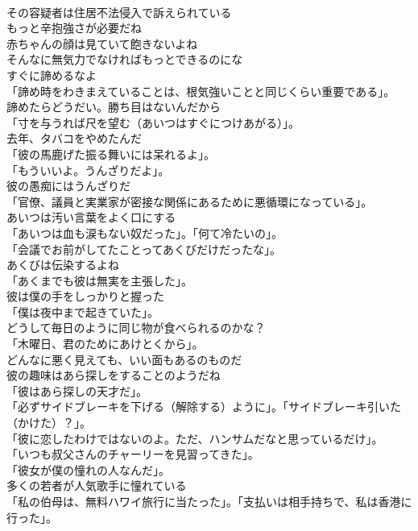 \documentclass[8pt]{extreport}
\begin{document}
\begin{CJK}{UTF8}{min}
\\	その容疑者は住居不法侵入で訴えられている	
\\	もっと辛抱強さが必要だね	
\\	赤ちゃんの顔は見ていて飽きないよね	
\\	そんなに無気力でなければもっとできるのにな	
\\	すぐに諦めるなよ	
\\	「諦め時をわきまえていることは、根気強いことと同じくらい重要である」。	
\\	諦めたらどうだい。勝ち目はないんだから	
\\	「寸を与うれば尺を望む（あいつはすぐにつけあがる）」。	
\\	去年、タバコをやめたんだ	
\\	「彼の馬鹿げた振る舞いには呆れるよ」。	
\\	「もういいよ。うんざりだよ」。	
\\	彼の愚痴にはうんざりだ	
\\	「官僚、議員と実業家が密接な関係にあるために悪循環になっている」。	
\\	あいつは汚い言葉をよく口にする	
\\	「あいつは血も涙もない奴だった」。「何て冷たいの」。	
\\	「会議でお前がしてたことってあくびだけだったな」。	
\\	あくびは伝染するよね	
\\	「あくまでも彼は無実を主張した」。	
\\	彼は僕の手をしっかりと握った	
\\	「僕は夜中まで起きていた」。	
\\	どうして毎日のように同じ物が食べられるのかな？	
\\	「木曜日、君のためにあけとくから」。	
\\	どんなに悪く見えても、いい面もあるのものだ	
\\	彼の趣味はあら探しをすることのようだね	
\\	「彼はあら探しの天才だ」。	
\\	「必ずサイドブレーキを下げる（解除する）ように」。「サイドブレーキ引いた（かけた）？」。	
\\	「彼に恋したわけではないのよ。ただ、ハンサムだなと思っているだけ」。	
\\	「いつも叔父さんのチャーリーを見習ってきた」。	
\\	「彼女が僕の憧れの人なんだ」。	
\\	多くの若者が人気歌手に憧れている	
\\	「私の伯母は、無料ハワイ旅行に当たった」。「支払いは相手持ちで、私は香港に行った」。	

\end{CJK}
\end{document}
